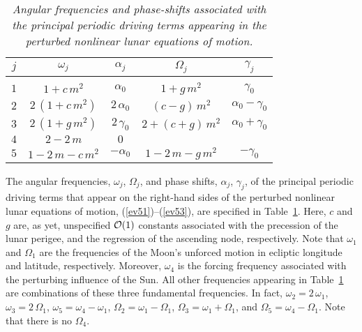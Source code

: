  \begin{table}\centering
 \begin{tabular}{c|cccc}\hline
 $j$ & $\omega_j$  &$\alpha_j$ & $\Omega_j$ & $\gamma_j$\\[0.5ex]\hline
 &&&&\\[-2ex]
 $1$ & $1+c\,m^2$ & $\alpha_0$  & $1+g\,m^2$ & $\gamma_0$\\[0.5ex]
 $2$ & $2\,(1+c\,m^2)$ & $2\,\alpha_0$ & $(c-g)\,m^2$ & $\alpha_0-\gamma_0$\\[0.5ex]
 $3$ & $2\,(1+g\,m^2)$ & $2\,\gamma_0$ & $2+(c+g)\,m^2$ & $\alpha_0+\gamma_0$\\[0.5ex]
 $4$ & $2-2\,m$ & $0$  &&\\[0.5ex]
 $5$ & $1-2\,m-c\,m^2$ & $-\alpha_0$ & $1-2\,m-g\,m^2$ & $-\gamma_0$
 \end{tabular}
 \caption{\em Angular frequencies and phase-shifts associated with the principal periodic driving terms appearing in
 the perturbed nonlinear lunar equations of motion.}\label{tv1}
 \end{table}
 
 The angular frequencies, $\omega_j$, $\Omega_j$, and phase shifts, $\alpha_j$, $\gamma_j$, of the principal periodic driving terms 
 that appear  on the right-hand sides of the perturbed nonlinear lunar equations of motion, (\ref{ev51})--(\ref{ev53}), are
 specified in Table~\ref{tv1}. Here, $c$ and $g$ are, as yet, unspecified ${\cal O}(1)$ constants associated with
 the precession of the lunar perigee, and the regression of the ascending node, respectively. 
 Note that $\omega_1$ and $\Omega_1$ are the  frequencies of the Moon's unforced motion in
 ecliptic longitude and latitude, respectively. Moreover, $\omega_4$ is the forcing frequency associated with the
 perturbing influence of the Sun. All other frequencies appearing in Table~\ref{tv1} are combinations of these
 three fundamental frequencies. In fact, $\omega_2=2\,\omega_1$, $\omega_3=2\,\Omega_1$, 
 $\omega_5=\omega_4-\omega_1$, $\Omega_2=\omega_1-\Omega_1$, $\Omega_3=\omega_1+\Omega_1$,
 and $\Omega_5=\omega_4-\Omega_1$.  Note that there is no $\Omega_4$.
 
